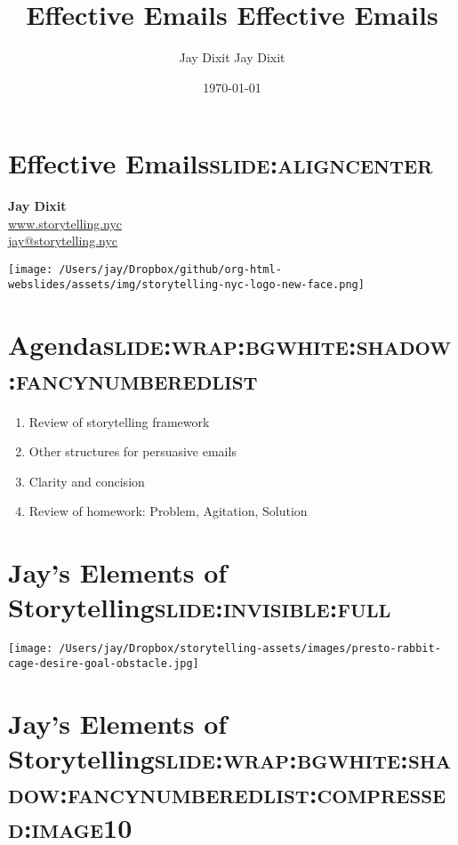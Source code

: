 \documentclass[12pt]{article}
\author{Jay Dixit Jay Dixit}
\date{\today}
\title{Effective Emails Effective Emails}
\def\maketitle{ \newgeometry{margin=1in} \thispagestyle{empty} \vfill \null \cleardoublepage\restoregeometry}
\begin{document}
\maketitle
\tableofcontents
\newpage


\section[Effective Emails]{Effective Emails\hfill{}\textsc{slide:aligncenter}}
\label{sec:org3a01c78}

\textbf{Jay Dixit} \\
\href{http://www.storytelling.nyc}{www.storytelling.nyc} \\
\href{mailto:jay@storytelling.nyc}{jay@storytelling.nyc} \\

\begin{center}
\texttt{[image: /Users/jay/Dropbox/github/org-html-webslides/assets/img/storytelling-nyc-logo-new-face.png]}
\end{center}

\section[Agenda]{Agenda\hfill{}\textsc{slide:wrap:bgwhite:shadow:fancynumberedlist}}
\label{sec:orgd27d402}
\begin{enumerate}
\item Review of storytelling framework
\item Other structures for persuasive emails
\item Clarity and concision
\item Review of homework: Problem, Agitation, Solution
\end{enumerate}

\section[Jay's Elements of \textbf{Storytelling}]{Jay's Elements of \textbf{Storytelling}\hfill{}\textsc{slide:invisible:full}}
\label{sec:org72f6910}
\begin{center}
\texttt{[image: /Users/jay/Dropbox/storytelling-assets/images/presto-rabbit-cage-desire-goal-obstacle.jpg]}
\end{center}


\section[Jay's Elements of \textbf{Storytelling}]{Jay's Elements of \textbf{Storytelling}\hfill{}\textsc{slide:wrap:bgwhite:shadow:fancynumberedlist:compressed:image10}}
\label{sec:org6065d26}
\end{document}
